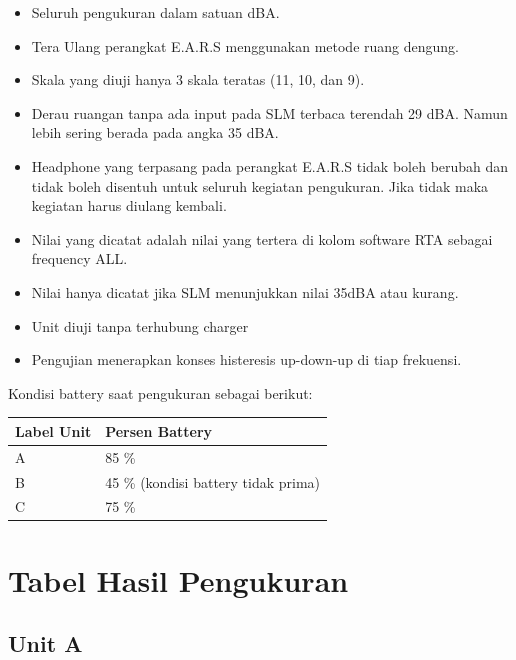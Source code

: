\documentclass{article} %
\begin{document}
	\begin{itemize}
		\item Seluruh pengukuran dalam satuan dBA.

		\item Tera Ulang perangkat E.A.R.S menggunakan metode ruang dengung.

		\item Skala yang diuji hanya 3 skala teratas (11, 10, dan 9).

		\item Derau ruangan tanpa ada input pada SLM terbaca terendah 29 dBA.
		Namun lebih sering berada pada angka 35 dBA.

		\item Headphone yang terpasang pada perangkat E.A.R.S tidak boleh berubah dan tidak boleh disentuh untuk
		seluruh kegiatan pengukuran. Jika tidak maka kegiatan harus diulang kembali.

		\item Nilai yang dicatat adalah nilai yang tertera di kolom software RTA sebagai frequency ALL.

		\item Nilai hanya dicatat jika SLM menunjukkan nilai 35dBA atau kurang.

		\item Unit diuji tanpa terhubung charger

		\item Pengujian menerapkan konses histeresis up-down-up di tiap frekuensi.
	\end{itemize}

	Kondisi battery saat pengukuran sebagai berikut:

	\begin{table}[!ht]
		\begin{tabular}{|l|l|}
			\hline
			\textbf{Label Unit}	& \textbf{Persen Battery}   \\ \hline
			A	& 85 \%   \\ \hline
			B	& 45 \% (kondisi battery tidak prima)   \\ \hline
			C	& 75 \%   \\ \hline
		\end{tabular}
	\end{table}

	\newpage
	\section{Tabel Hasil Pengukuran}

	\subsection{Unit A}
\end{document}
